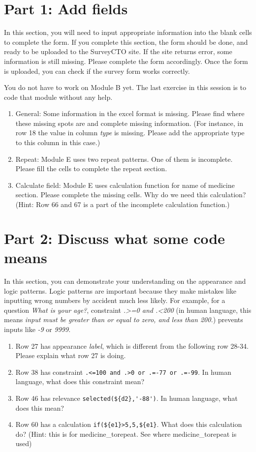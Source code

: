 \documentclass{tufte-handout}
\begin{document}
\section{Part 1: Add fields}
In this section, you will need to input appropriate information into the blank cells to complete the form. If you complete this section, the form should be done, and ready to be uploaded to the SurveyCTO site. If the site returns error, some information is still missing. Please complete the form accordingly. Once the form is uploaded, you can check if the survey form works correctly. 

You do not have to work on Module B yet. The last exercise in this session is to code that module without any help.

\begin{enumerate}
	\item General: Some information in the excel format is missing. Please find where these missing spots are and complete missing information. (For instance, in row 18 the value in column \textit{type} is missing. Please add the appropriate type to this column in this case.) 
	\item Repeat: Module E uses two repeat patterns. One of them is incomplete. Please fill the cells to complete the repeat section.
	\item Calculate field: Module E uses calculation function for name of medicine section. Please complete the missing cells. Why do we need this calculation? (Hint: Row 66 and 67 is a part of the incomplete calculation function.)
\end{enumerate}

\section{Part 2: Discuss what some code means}
In this section, you can demonstrate your understanding on the appearance and logic patterns. Logic patterns are important because they make mistakes like inputting wrong numbers by accident much less likely. For example, for a question \textit{What is your age?}, constraint \textit{.>=0 and .<200} (in human language, this means \textit{input must be greater than or equal to zero, and less than 200.}) prevents inputs like \textit{-9} or \textit{9999}. 

\begin{enumerate}
	\item Row 27 has appearance \textit{label}, which is different from the following row 28-34. Please explain what row 27 is doing.
	\item Row 38 has constraint \verb|.<=100 and .>0 or .=-77 or .=-99|. In human language, what does this constraint mean?
	\item Row 46 has relevance  \verb|selected(${d2},'-88')|. In human language, what does this mean? 
	\item Row 60 has a calculation  \verb|if(${e1}>5,5,${e1}|. What does this calculation do? (Hint: this is for medicine\_torepeat. See where medicine\_torepeat is used)
\end{enumerate}
\end{document}
